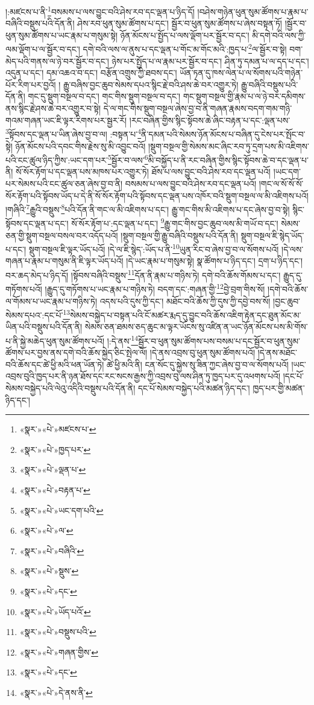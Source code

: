 །:མཛངས་པ་ནི་\footnote{«སྣར་»«པེ་»མཛངས་པ་}བསམས་པ་ལས་བྱུང་བའི་ཤེས་རབ་དང་ལྡན་པ་ཉིད་དོ། །བཤེས་གཉེན་ཕུན་སུམ་ཚོགས་པ་རྣམ་པ་བཞིའི་བསྡུས་པའི་དོན་ནི། ཤེས་རབ་ཕུན་སུམ་ཚོགས་པ་དང་། སྦྱོར་བ་ཕུན་སུམ་ཚོགས་པ་ཞེས་བསྟན་ཏོ། །སྦྱོར་བ་ཕུན་སུམ་ཚོགས་པ་ཡང་རྣམ་པ་གསུམ་སྟེ། ཉོན་མོངས་པ་སྤྱོད་པ་ལས་ལྡོག་པར་སྦྱོར་བ་དང་། མི་དགེ་བའི་ལས་ཀྱི་ལམ་ལྡོག་པ་ལ་སྦྱོར་བ་དང་། དགེ་བའི་ལས་ལ་ནུས་པ་དང་ལྡན་པ་གོང་མ་གོང་མའི་:ཁྱད་པ་\footnote{«སྣར་»«པེ་»ཁྱད་པར་}ལ་སྦྱོར་བ་སྟེ། བག་མེད་པའི་གནས་ལ་ཉེ་བར་སྦྱོར་བ་དང་། ཉེས་པར་སྤྱོད་པ་ལ་རྣམ་པར་སྦྱོར་བ་དང་། ཤིན་ཏུ་དམན་པ་ལ་དད་པ་དང་། འདུན་པ་དང་། དམ་འཆའ་བ་དང་། བརྩོན་འགྲུས་ཀྱི་ཐབས་དང་། ཡོན་ཏན་དུ་ཁས་ལེན་པ་ལ་སོགས་པའི་གཉེན་པོར་རིག་པར་བྱའོ། །
རྒྱུ་བཞིས་བྱང་ཆུབ་སེམས་དཔའ་སྙིང་རྗེ་བའི་ཤས་ཆེ་བར་འགྱུར་ཏེ། རྒྱུ་བཞིའི་བསྡུས་པའི་དོན་ནི། གང་དུ་སྡུག་བསྔལ་བ་དང་། གང་གིས་སྡུག་བསྔལ་བ་དང་། གང་སྡུག་བསྔལ་གྱི་རྣམ་པ་ལ་ཉེ་བར་དམིགས་ནས་སྙིང་རྗེ་ཤས་ཆེ་བར་འགྱུར་བ་སྟེ། དེ་ལ་གང་གིས་སྡུག་བསྔལ་ཞེས་བྱ་བ་ནི་གཞན་རྣམས་བདག་གམ་གཉི་གའམ་གཞན་ཡང་ཇི་ལྟར་རིགས་པར་སྦྱར་རོ། །རང་བཞིན་གྱིས་སྙིང་སྟོབས་ཆེ་ཞིང་བརྟན་པ་དང་:ལྡན་པས་\footnote{«སྣར་»«པེ་»ལྡན་པ་}སྟོབས་དང་ལྡན་པ་ཡིན་ཞེས་བྱ་བ་ལ། :བསྟན་པ་\footnote{«སྣར་»«པེ་»བརྟན་པ་}ནི་དམན་པའི་སེམས་ཉོན་མོངས་པ་བཞིན་དུ་ངེས་པར་སྤོང་བ་སྟེ། ཉོན་མོངས་པའི་དབང་གིས་རྗེས་སུ་མི་འབྱུང་བའོ། །སྡུག་བསྔལ་གྱི་སེམས་མང་ཞིང་རབ་ཏུ་དྲག་པས་མི་འཇིགས་པའི་ངང་ཚུལ་ཉིད་ཀྱིས་:ཡང་དག་པར་\footnote{«སྣར་»«པེ་»ཡང་དག་པའི་}སྦྱོར་བ་ལས་\footnote{«སྣར་»«པེ་»ལ་}མི་བསྐྱོད་པ་ནི་རང་བཞིན་གྱིས་སྙིང་སྟོབས་ཆེ་བ་དང་ལྡན་པ་ནི། སོ་སོར་རྟོག་པ་དང་ལྡན་པས་མཁས་པར་འགྱུར་ཏེ། ཐོས་པ་ལས་བྱུང་བའི་ཤེས་རབ་དང་ལྡན་པའོ། །ཡང་དག་པར་སེམས་པའི་ངང་ཚུལ་ཅན་ཞེས་བྱ་བ་ནི། བསམས་པ་ལས་བྱུང་བའི་ཤེས་རབ་དང་ལྡན་པའོ། །གང་ལ་སོ་སོ་སོ་སོར་རྟོག་པའི་སྟོབས་ཡོད་པ་དེ་ནི་སོ་སོར་རྟོག་པའི་སྟོབས་དང་ལྡན་པས་འཁོར་བའི་སྡུག་བསྔལ་ལ་མི་འཇིགས་པའོ། །གཞིའི་\footnote{«སྣར་»«པེ་»བཞིའི་}རྒྱུའི་བསྡུས་\footnote{«སྣར་»«པེ་»སྡུས་}པའི་དོན་ནི་གང་ལ་མི་འཇིགས་པ་དང་། རྒྱུ་གང་གིས་མི་འཇིགས་པ་དང་ཞེས་བྱ་བ་སྟེ། སྙིང་སྟོབས་དང་ལྡན་པ་དང་། སོ་སོར་རྟོག་པ་:དང་ལྡན་པ་དང་། \footnote{«སྣར་»«པེ་»དང་}རྒྱུ་གང་གིས་བྱང་ཆུབ་ལས་མི་གཡོ་བ་དང་། སེམས་ཅན་གྱི་སྡུག་བསྔལ་བསལ་བར་འདོད་པའོ། །སྡུག་བསྔལ་གྱི་རྒྱུ་བཞིའི་བསྡུས་པའི་དོན་ནི། སྡུག་བསྔལ་ཇི་སྙེད་ཡོད་པ་དང་། སྡུག་བསྔལ་ཇི་ལྟར་ཡོད་པའོ། །དེ་ལ་ཇི་སྙེད་:ཡོད་པ་ནི་\footnote{«སྣར་»«པེ་»ཡོད་པའོ་}ཡུན་རིང་བ་ཞེས་བྱ་བ་ལ་སོགས་པའོ། །དེ་ལས་གཞན་པ་རྣམ་པ་གསུམ་ནི་ཇི་ལྟར་ཡོད་པའོ། །དེ་ཡང་རྣམ་པ་གསུམ་སྟེ། སྣ་ཚོགས་པ་ཉིད་དང་། དྲག་པ་ཉིད་དང་། བར་ཆད་མེད་པ་ཉིད་དོ། །སྟོབས་བཞིའི་བསྡུས་\footnote{«སྣར་»«པེ་»བསྡུས་པའི་}དོན་ནི་རྣམ་པ་གཉིས་ཏེ། དགེ་བའི་ཆོས་གོམས་པ་དང་། རྒྱུད་དུ་གཏོགས་པའོ། །རྒྱུད་དུ་གཏོགས་པ་ཡང་རྣམ་པ་གཉིས་ཏེ། བདག་དང་:གཞན་གྱི་\footnote{«སྣར་»«པེ་»གཞན་གྱིས་}བྱེ་བྲག་གིས་སོ། །དགེ་བའི་ཆོས་ལ་གོམས་པ་ཡང་རྣམ་པ་གཉིས་ཏེ། འདས་པའི་དུས་ཀྱི་དང་། མཐོང་བའི་ཆོས་ཀྱི་དུས་ཀྱི་དབྱེ་བས་སོ། །བྱང་ཆུབ་སེམས་དཔའ་:དང་པོ་\footnote{«སྣར་»«པེ་»དང་}སེམས་བསྐྱེད་པ་བསྟན་པའི་ངོ་མཚར་རྨད་དུ་བྱུང་བའི་ཆོས་འཇིག་རྟེན་དང་ཐུན་མོང་མ་ཡིན་པའི་བསྡུས་པའི་དོན་ནི། སེམས་ཅན་ཐམས་ཅད་ཆུང་མ་ལྟར་ཡོངས་སུ་འཛིན་ན་ཡང་ཉོན་མོངས་པས་མི་གོས་པ་ནི་སྐྱེ་མཆེད་ཕུན་སུམ་ཚོགས་པའོ། །:དེ་ནས་\footnote{«སྣར་»«པེ་»དེ་ནས་ནི་}སྦྱོར་བ་ཕུན་སུམ་ཚོགས་པས་བསམ་པ་དང་སྦྱོར་བ་ཕུན་སུམ་ཚོགས་པར་བྱས་ནས་དགེ་བའི་ཆོས་སྐྱེད་ཅིང་སྤེལ་ལོ། །དེ་ནས་འབྲས་བུ་ཕུན་སུམ་ཚོགས་པའོ། །དེ་ནས་མཐོང་བའི་ཆོས་དང་ཚེ་ཕྱི་མའི་ཕན་ཡོན་ཏེ། ཚེ་ཕྱི་མའི་ནི། ངན་སོང་དུ་སྐྱེས་སུ་ཟིན་ཀྱང་ཞེས་བྱ་བ་ལ་སོགས་པའོ། །ཡང་འབྲས་བུའི་ཁྱད་པར་ནི་ཉན་ཐོས་དང་རང་སངས་རྒྱས་ཀྱི་འབྲས་བུ་ལས་ཤིན་ཏུ་ཁྱད་པར་དུ་འཕགས་པའོ། །དང་པོ་སེམས་བསྐྱེད་པའི་ལེའུ་འདིའི་བསྡུས་པའི་དོན་ནི། དང་པོ་སེམས་བསྐྱེད་པའི་མཚན་ཉིད་དང་། ཁྱད་པར་གྱི་མཚན་ཉིད་དང་། 